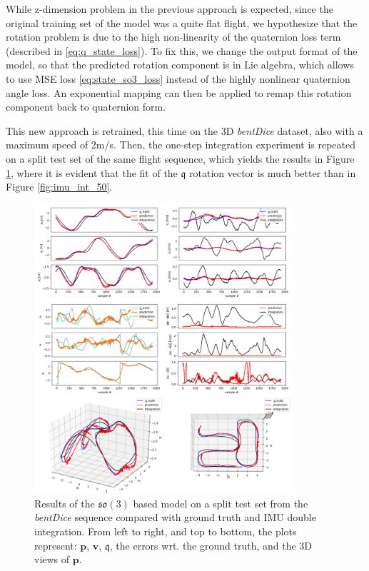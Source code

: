 While z-dimension problem in the previous approach is expected, since the original training set of the model was a quite flat flight, we hypothesize that the rotation problem is due to the high non-linearity of the quaternion loss term (described in \ref{eq:q_state_loss}).
To fix this, we change the output format of the model, so that the predicted rotation component is in Lie algebra, which allows to use MSE loss \ref{eq:state_so3_loss} instead of the highly nonlinear quaternion angle loss.
An exponential mapping can then be applied to remap this rotation component back to quaternion form.

This new approach is retrained, this time on the 3D \emph{bentDice} dataset, also with a maximum speed of 2m/s.
Then, the one-step integration experiment is repeated on a split test set of the same flight sequence, which yields the results in Figure \ref{fig:imu_so3_bentdice_val}, where it is evident that the fit of the $\boldsymbol{\mathfrak{q}}$ rotation vector is much better than in Figure \ref{fig:imu_int_50}.

\begin{figure}[h]
   \centering
   \includegraphics[width=0.85\textwidth]{thesis_template/img/imu_int_50_so3_bentDice_validation_full.jpg}
   \caption{Results of the $\mathfrak{so}(3)$ based model on a split test set from the \emph{bentDice} sequence compared with ground truth and IMU double integration. From left to right, and top to bottom, the plots represent: $\mathbf{p}$, $\mathbf{v}$, $\boldsymbol{\mathfrak{q}}$, the errors wrt. the ground truth, and the 3D views of $\mathbf{p}$.}
   \label{fig:imu_so3_bentdice_val}
\end{figure}

